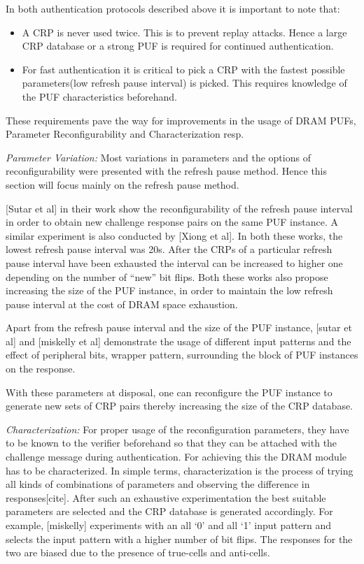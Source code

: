 \documentclass[journal, a4paper]{IEEEtran}
\begin{document}
In both authentication protocols described above it is important to note that:
\begin{itemize}
    \item A CRP is never used twice. This is to prevent replay attacks. Hence a large CRP database or a strong PUF is required for continued authentication.
    \item For fast authentication it is critical to pick a CRP with the fastest possible parameters(low refresh pause interval) is picked. This requires knowledge of the PUF characteristics beforehand.
\end{itemize}

These requirements pave the way for improvements in the usage of DRAM PUFs, Parameter Reconfigurability and Characterization resp.

\textit{Parameter Variation:} Most variations in parameters and the options of reconfigurability were presented with the refresh pause method. Hence this section will focus mainly on the refresh pause method.

[Sutar et al] in their work show the reconfigurability of the refresh pause interval in order to obtain new challenge response pairs on the same PUF instance. A similar experiment is also conducted by [Xiong et al]. In both these works, the lowest refresh pause interval was 20s. After the CRPs of a particular refresh pause interval have been exhausted the interval can be increased to higher one depending on the number of “new” bit flips. Both these works also propose increasing the size of the PUF instance, in order to maintain the low refresh pause interval at the cost of DRAM space exhaustion. 

Apart from the refresh pause interval and the size of the PUF instance, [sutar et al] and [miskelly et al] demonstrate the usage of different input patterns and the effect of peripheral bits, wrapper pattern, surrounding the block of PUF instances on the response.

With these parameters at disposal, one can reconfigure the PUF instance to generate new sets of CRP pairs thereby increasing the size of the CRP database.

\textit{Characterization:} For proper usage of the reconfiguration parameters, they have to be known to the verifier beforehand so that they can be attached with the challenge message during authentication. For achieving this the DRAM module has to be characterized. In simple terms, characterization is the process of trying all kinds of combinations of parameters and observing the difference in responses[cite]. After such an exhaustive experimentation the best suitable parameters are selected and the CRP database is generated accordingly. For example, [miskelly] experiments with an all ‘0’ and all ‘1’ input pattern and selects the input pattern with a higher number of bit flips. The responses for the two are biased due to the presence of true-cells and anti-cells.
\end{document}
